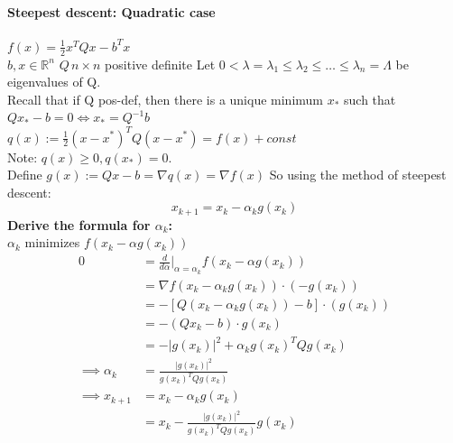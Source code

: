 \documentclass[11pt]{article}
\newcommand{\tb}[1]{\textbf{#1}}
\newcommand{\real}[0]{\mathbb{R}}
\begin{document}
\paragraph{Steepest descent: Quadratic case}
$f(x) = \frac{1}{2} x^T Q x - b^T x$ \\
$b, x \in \real^n$ $Q \, n \times n$ positive definite
Let $0 < \lambda = \lambda_1 \leq \lambda_2 \leq \hdots \leq \lambda_n = \Lambda$ be eigenvalues of Q. \\
Recall that if Q pos-def, then there is a unique minimum $x_*$ such that $Qx_* - b = 0 \iff  x_* = Q^{-1}b$\\
$q(x) := \frac{1}{2}(x - x^*)^TQ(x - x^*) = f(x) + const$ \\
Note: $q(x) \geq 0, q(x_*) = 0$. \\
Define $g(x) := Qx - b  = \nabla q(x) = \nabla f(x)$
So using the method of steepest descent: 
$$x_{k+1} = x_k - \alpha_k g(x_k)$$
\tb{Derive the formula for $\alpha_k$:} \\
$\alpha_k$ minimizes $f(x_k - \alpha g(x_k))$
\begin{align}
	0 &= \frac{d}{d\alpha}|_{\alpha = \alpha_k} f(x_k - \alpha g(x_k)) \\
	&= \nabla f(x_k - \alpha_k g(x_k)) \cdot (-g(x_k)) \\
	&= - [Q (x_k - \alpha_k g(x_k)) - b] \cdot (g(x_k)) \\
	&= -(Q x_k - b) \cdot g(x_k) \\
	&= - |g(x_k)|^2 + \alpha_k g(x_k)^T Q g(x_k) \\
	\implies \alpha_k &= \frac{|g(x_k)|^2}{g(x_k)^TQg(x_k)}\\
	\implies x_{k+1} &= x_k - \alpha_k g(x_k) \\
	&= x_k - \frac{|g(x_k)|^2}{g(x_k)^T Q g(x_k)} g(x_k)
\end{align}
\end{document}
